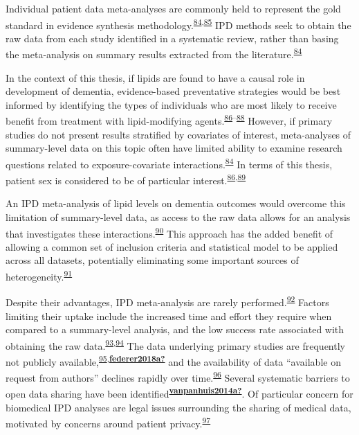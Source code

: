 \documentclass[a4paper, twoside]{templates/ociamthesis}
\begin{document}
Individual patient data meta-analyses are commonly held to represent the gold standard in evidence synthesis methodology.\textsuperscript{\protect\hyperlink{ref-riley2010}{84},\protect\hyperlink{ref-stewart1993}{85}} IPD methods seek to obtain the raw data from each study identified in a systematic review, rather than basing the meta-analysis on summary results extracted from the literature.\textsuperscript{\protect\hyperlink{ref-riley2010}{84}}

In the context of this thesis, if lipids are found to have a causal role in development of dementia, evidence-based preventative strategies would be best informed by identifying the types of individuals who are most likely to receive benefit from treatment with lipid-modifying agents.\textsuperscript{\protect\hyperlink{ref-arain2009}{86}--\protect\hyperlink{ref-mccartney2016}{88}} However, if primary studies do not present results stratified by covariates of interest, meta-analyses of summary-level data on this topic often have limited ability to examine research questions related to exposure-covariate interactions.\textsuperscript{\protect\hyperlink{ref-riley2010}{84}} In terms of this thesis, patient sex is considered to be of particular interest.\textsuperscript{\protect\hyperlink{ref-arain2009}{86},\protect\hyperlink{ref-letenneur1999}{89}}

An IPD meta-analysis of lipid levels on dementia outcomes would overcome this limitation of summary-level data, as access to the raw data allows for an analysis that investigates these interactions.\textsuperscript{\protect\hyperlink{ref-riley2020}{90}} This approach has the added benefit of allowing a common set of inclusion criteria and statistical model to be applied across all datasets, potentially eliminating some important sources of heterogeneity.\textsuperscript{\protect\hyperlink{ref-stewart2002}{91}}

Despite their advantages, IPD meta-analysis are rarely performed.\textsuperscript{\protect\hyperlink{ref-tugwell2010}{92}} Factors limiting their uptake include the increased time and effort they require when compared to a summary-level analysis, and the low success rate associated with obtaining the raw data.\textsuperscript{\protect\hyperlink{ref-nevitt2017a}{93},\protect\hyperlink{ref-ventresca2020}{94}} The data underlying primary studies are frequently not publicly available,\textsuperscript{\protect\hyperlink{ref-alsheikh-ali2011}{95},\protect\hyperlink{ref-federer2018a}{\textbf{federer2018a?}}} and the availability of data ``available on request from authors'' declines rapidly over time.\textsuperscript{\protect\hyperlink{ref-vines2014}{96}} Several systematic barriers to open data sharing have been identified\textsuperscript{\protect\hyperlink{ref-vanpanhuis2014a}{\textbf{vanpanhuis2014a?}}}. Of particular concern for biomedical IPD analyses are legal issues surrounding the sharing of medical data, motivated by concerns around patient privacy.\textsuperscript{\protect\hyperlink{ref-wartenberg2010}{97}}
\end{document}
